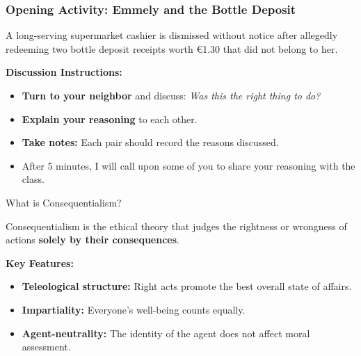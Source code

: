 \documentclass[aspectratio=169, 10pt]{beamer}
\begin{document}
\begin{frame}
\frametitle{Opening Activity: Emmely and the Bottle Deposit}

\begin{tcolorbox}[colback=WHUblue!5!white, colframe=WHUblue, title=Scenario, fonttitle=\bfseries, sharp corners=south]
A long-serving supermarket cashier is dismissed without notice after allegedly redeeming two bottle deposit receipts worth €1.30 that did not belong to her.
\end{tcolorbox}

\vspace{1em}

\textbf{Discussion Instructions:}
\begin{itemize}
    \item \textbf{Turn to your neighbor} and discuss: \textit{Was this the right thing to do?}
    \item \textbf{Explain your reasoning} to each other.
    \item \textbf{Take notes:} Each pair should record the reasons discussed.
    \item After 5 minutes, I will call upon some of you to share your reasoning with the class.
\end{itemize}
\end{frame}

\begin{frame}{What is Consequentialism?}

\begin{tcolorbox}[colback=WHUblue!5!white, colframe=WHUblue, title=Definition, fonttitle=\bfseries, sharp corners=south]
Consequentialism is the ethical theory that judges the rightness or wrongness of actions \textbf{solely by their consequences}.
\end{tcolorbox}

\vspace{1em}

\textbf{Key Features:}
\begin{itemize}
    \item \textbf{Teleological structure:} Right acts promote the best overall state of affairs.
    \item \textbf{Impartiality:} Everyone's well-being counts equally.
    \item \textbf{Agent-neutrality:} The identity of the agent does not affect moral assessment.
\end{itemize}

\end{frame}
\end{document}
